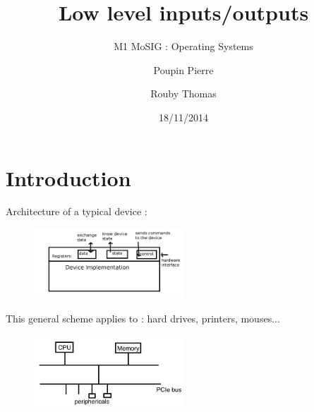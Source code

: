 \documentclass[a4paper,10pt]{article}
\title{\textbf{Low level inputs/outputs}}
\subtitle{M1 MoSIG : Operating Systems}
\author{Poupin Pierre \and Rouby Thomas}
\date{18/11/2014}
\begin{document}
\maketitle

\section{Introduction}

Architecture of a typical device :

\begin{figure}[h!]
  \begin{center}
    \includegraphics[width=0.5\textwidth]{architecture_device.png}
    \caption{}
    \label{Architecture of a typical device}
  \end{center}
\end{figure}

This general scheme applies to : hard drives, printers, mouses...

\begin{figure}[h!]
  \begin{center}
    \includegraphics[width=0.5\textwidth]{computer_layout.png}
    \caption{}
    \label{fig:}
  \end{center}
\end{figure}
\end{document}
